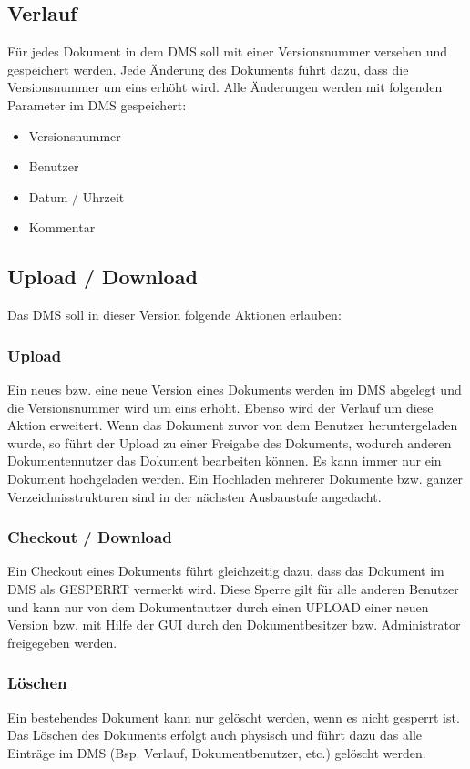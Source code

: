 \documentclass[11pt, a4paper]{article}
\begin{document}
\subsection*{Verlauf}

Für jedes Dokument in dem DMS soll mit einer Versionsnummer versehen und gespeichert werden. Jede Änderung des Dokuments führt dazu, dass die Versionsnummer um eins erhöht wird. Alle Änderungen werden mit folgenden Parameter im DMS gespeichert:

\begin{itemize}
\item Versionsnummer
\item Benutzer
\item Datum / Uhrzeit
\item Kommentar
\end{itemize}

\subsection*{Upload / Download}

Das DMS soll in dieser Version folgende Aktionen erlauben:

\subsubsection*{Upload}
Ein neues bzw. eine neue Version eines Dokuments werden im DMS abgelegt und die Versionsnummer wird um eins erhöht. Ebenso wird der Verlauf um diese Aktion erweitert. Wenn das Dokument zuvor von dem Benutzer heruntergeladen wurde, so führt der Upload zu einer Freigabe des Dokuments, wodurch anderen Dokumentennutzer das Dokument bearbeiten können. Es kann immer nur ein Dokument hochgeladen werden. Ein Hochladen mehrerer Dokumente bzw. ganzer Verzeichnisstrukturen sind in der nächsten Ausbaustufe angedacht.

\subsubsection*{Checkout / Download}
Ein Checkout eines Dokuments führt gleichzeitig dazu, dass das Dokument im DMS als GESPERRT vermerkt wird. Diese Sperre gilt für alle anderen Benutzer und kann nur von dem Dokumentnutzer durch einen UPLOAD einer neuen Version bzw. mit Hilfe der GUI durch den Dokumentbesitzer bzw. Administrator freigegeben werden.

\subsubsection*{Löschen}
Ein bestehendes Dokument kann nur gelöscht werden, wenn es nicht gesperrt ist. Das Löschen des Dokuments erfolgt auch physisch und führt dazu das alle Einträge im DMS (Bsp. Verlauf, Dokumentbenutzer, etc.) gelöscht werden.
\end{document}
